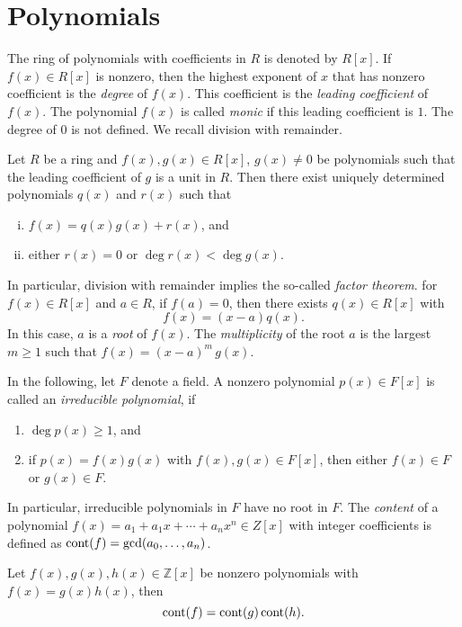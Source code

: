 \section{Polynomials}
\label{sec:polynomials}

The ring of polynomials with coefficients in $R$ is denoted by $R[x]$. If $f(x) ∈ R[x]$ is nonzero, then the highest exponent of $x$ that has nonzero coefficient is the \emph{degree} of $f(x)$. This coefficient is the \emph{leading coefficient} of $f(x)$. The polynomial $f(x)$ is called \emph{monic} if this leading coefficient is $1$. The degree of $0$ is not defined.  We recall division with remainder. 
\begin{theorem}
  \label{thr:5}
  Let $R$ be a ring and $f(x),g(x)∈R[x]$, $g(x) ≠0$  be polynomials such that the leading coefficient of $g$ is a unit in $R$. Then there exist uniquely determined polynomials $q(x)$ and $r(x)$ such that
  \begin{enumerate}[i)]
  \item $f(x) = q(x) g(x) + r(x)$, and
  \item either $r(x) = 0$ or $\deg r(x) < \deg g(x)$.
  \end{enumerate}
\end{theorem}
%
In particular, division with remainder implies the so-called \emph{factor theorem}. for $f(x) ∈ R[x]$ and $a ∈R$, if $f(a) = 0$, then there exists $q(x) ∈ R[x]$ with
\begin{displaymath}
  f(x) = (x - a) q(x). 
\end{displaymath}
In this case, $a$ is a \emph{root} of $f(x)$. The \emph{multiplicity} of the root $a$ is the largest $m≥1$ such that $f(x) = (x-a)^m \, g(x)$.

In the following, let $F$ denote a field. A nonzero polynomial $p(x) ∈ F[x]$ is called an \emph{irreducible polynomial}, if
\begin{enumerate}[(1)]
\item $\deg p(x) ≥1$, and
\item if $p(x) = f(x) g(x)$ with $f(x),g(x) ∈ F[x]$, then either $f(x) ∈ F$ or $g(x) ∈F$. 
\end{enumerate}
In particular, irreducible polynomials in $F$ have no root in $F$.
The \emph{content} of a polynomial $f(x) = a_1 + a_1 x + \cdots + a_n x^n ∈ Z[x]$  with integer coefficients is defined as $\operatorname{cont}(f) = \gcd(a_0,\dots,a_n)$. 

\begin{theorem}
  Let $f(x),g(x), h(x) ∈ℤ[x]$ be nonzero polynomials with $f(x) = g(x) h(x)$, then
  \begin{displaymath}
    \operatorname{cont} (f) = \operatorname{cont} (g) \operatorname{cont} (h).  
  \end{displaymath}
\end{theorem}

